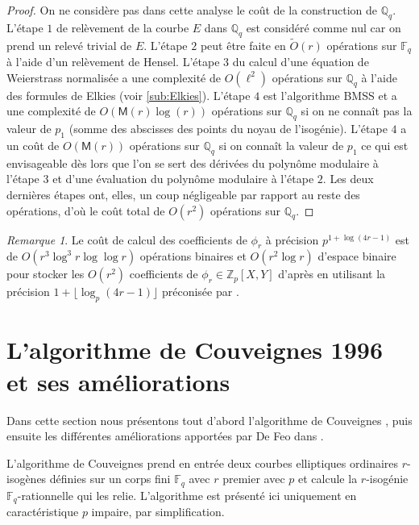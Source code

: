\documentclass[10pt,a4paper]{book}
\theoremstyle{plain}
\theoremstyle{definition}
\theoremstyle{definition}
\theoremstyle{definition}
\theoremstyle{definition}
\theoremstyle{definition}
\theoremstyle{remark}
\newtheorem{rem}[thm]{Remarque}
\theoremstyle{remark}
\theoremstyle{definition}
\begin{document}
\begin{proof}
On ne considère pas dans cette analyse le coût de la construction de $\mathbb{Q}_q$.
L'étape $1$ de relèvement de la courbe $E$ dans $\mathbb{Q}_q$ est considéré 
comme nul car on prend un relevé trivial de $E$.
L'étape $2$ peut être faite en $\tilde{O}(r)$ opérations sur $\mathbb{F}_q$ à 
l'aide d'un relèvement de Hensel. 
L'étape $3$ du calcul d'une équation de Weierstrass normalisée a une complexité
de $O(\ell^2)$ opérations sur $\mathbb{Q}_q$ à l'aide des formules de Elkies 
\cite{Elkies1998} (voir \ref{sub:Elkies}).
L'étape $4$ est l'algorithme BMSS et a une complexité de 
$O(\mathsf{M}(r)\log(r))$ opérations sur $\mathbb{Q}_q$ si on ne connaît pas la
valeur de $p_1$ (somme des abscisses des points du noyau de l'isogénie). 
L'étape $4$ a un coût de $O(\mathsf{M}(r))$ opérations sur $\mathbb{Q}_q$ si on
connaît la valeur de $p_1$ ce qui est envisageable dès lors que l'on se sert 
des dérivées du polynôme modulaire à l'étape $3$ et d'une évaluation du 
polynôme modulaire à l'étape $2$.
Les deux dernières étapes ont, elles, un coup négligeable par rapport au reste 
des opérations, d'où le coût total de $O(r^2)$ opérations sur $\mathbb{Q}_q$.
\end{proof}

\begin{rem}
Le coût de calcul des coefficients de $\phi_{r}$ à précision 
$p^{1+\log(4r -1)}$ est de $O(r^3 \log^3r \log\log r)$ opérations binaires et 
$O(r^2 \log r)$ d'espace binaire pour stocker les $O(r^2)$ coefficients de 
$\phi_{r} \in \mathbb{Z}_p[X,Y]$ d'après \cite[Algorithm 6.1, Theorem 1]{BLS12}
en utilisant la précision $1+ \lfloor \log_p(4r-1) \rfloor$ préconisée par 
\cite[Theorem 2]{LairezVaccon16}.
\end{rem}


\section{L'algorithme de Couveignes 1996 et ses améliorations}
Dans cette section nous présentons tout d'abord l'algorithme de Couveignes 
\cite{Couveignes96}, puis ensuite les différentes améliorations apportées par 
De Feo dans \cite{DeFeo11}.

L'algorithme de Couveignes prend en entrée deux courbes elliptiques  ordinaires $r$-isogènes définies sur un corps fini $\mathbb{F}_q$ avec $r$ premier avec $p$ et calcule la $r$-isogénie $\mathbb{F}_q$-rationnelle qui les relie. L'algorithme est présenté ici uniquement en caractéristique $p$ impaire, par simplification.
\end{document}
